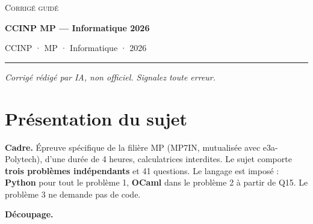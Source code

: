 \documentclass[11pt,a4paper]{article}
\begin{document}
\thispagestyle{plain}
\begin{center}
  {\small\scshape Corrigé guidé}\par\smallskip
  {\LARGE\bfseries CCINP MP — Informatique 2026\par}\medskip
  {\large CCINP · MP · Informatique · 2026\par}
\end{center}
\vspace{2pt}\hrule\vspace{8pt}

\emph{Corrigé rédigé par IA, non officiel. Signalez toute erreur.}

\hypertarget{pruxe9sentation-du-sujet}{%
\section{Présentation du sujet}\label{pruxe9sentation-du-sujet}}

\textbf{Cadre.} Épreuve spécifique de la filière MP (MP7IN, mutualisée avec e3a-Polytech), d'une durée de 4 heures, calculatrices interdites. Le sujet comporte \textbf{trois problèmes indépendants} et 41 questions. Le langage est imposé : \textbf{Python} pour tout le problème 1, \textbf{OCaml} dans le problème 2 à partir de Q15. Le problème 3 ne demande pas de code.

\textbf{Découpage.}
\end{document}
